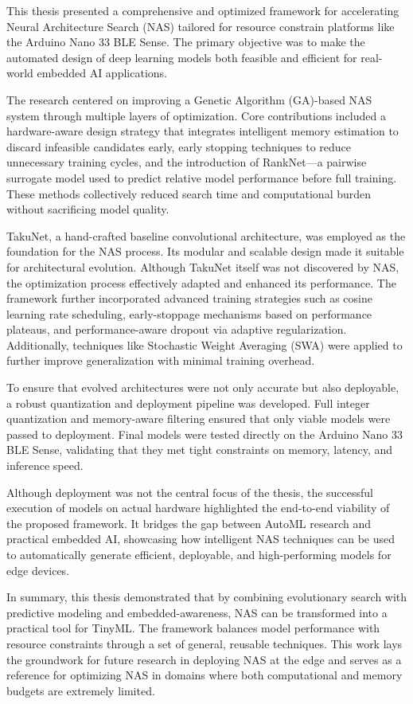 This thesis presented a comprehensive and optimized framework for accelerating Neural Architecture Search (NAS) tailored for resource constrain platforms like the Arduino Nano 33 BLE Sense. The primary objective was to make the automated design of deep learning models both feasible and efficient for real-world embedded AI applications.

The research centered on improving a Genetic Algorithm (GA)-based NAS system through multiple layers of optimization. Core contributions included a hardware-aware design strategy that integrates intelligent memory estimation to discard infeasible candidates early, early stopping techniques to reduce unnecessary training cycles, and the introduction of RankNet—a pairwise surrogate model used to predict relative model performance before full training. These methods collectively reduced search time and computational burden without sacrificing model quality.

TakuNet, a hand-crafted baseline convolutional architecture, was employed as the foundation for the NAS process. Its modular and scalable design made it suitable for architectural evolution. Although TakuNet itself was not discovered by NAS, the optimization process effectively adapted and enhanced its performance. The framework further incorporated advanced training strategies such as cosine learning rate scheduling, early-stoppage mechanisms based on performance plateaus, and performance-aware dropout via adaptive regularization. Additionally, techniques like Stochastic Weight Averaging (SWA) were applied to further improve generalization with minimal training overhead.

To ensure that evolved architectures were not only accurate but also deployable, a robust quantization and deployment pipeline was developed. Full integer quantization and memory-aware filtering ensured that only viable models were passed to deployment. Final models were tested directly on the Arduino Nano 33 BLE Sense, validating that they met tight constraints on memory, latency, and inference speed.

Although deployment was not the central focus of the thesis, the successful execution of models on actual hardware highlighted the end-to-end viability of the proposed framework. It bridges the gap between AutoML research and practical embedded AI, showcasing how intelligent NAS techniques can be used to automatically generate efficient, deployable, and high-performing models for edge devices.

In summary, this thesis demonstrated that by combining evolutionary search with predictive modeling and embedded-awareness, NAS can be transformed into a practical tool for TinyML. The framework balances model performance with resource constraints through a set of general, reusable techniques. This work lays the groundwork for future research in deploying NAS at the edge and serves as a reference for optimizing NAS in domains where both computational and memory budgets are extremely limited.
